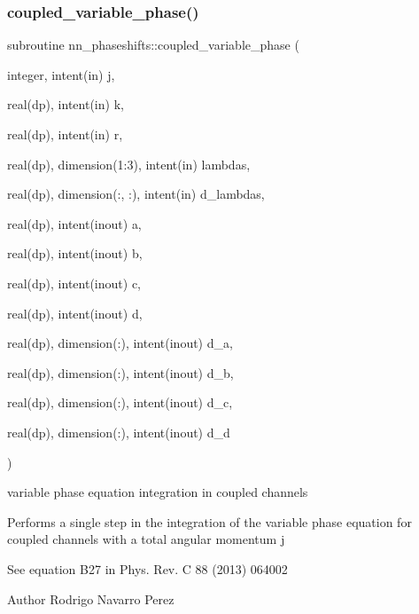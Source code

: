 \subsubsection{\texorpdfstring{coupled\+\_\+variable\+\_\+phase()}{coupled\_variable\_phase()}}
{\footnotesize\ttfamily subroutine nn\+\_\+phaseshifts\+::coupled\+\_\+variable\+\_\+phase (\begin{DoxyParamCaption}\item[{integer, intent(in)}]{j,  }\item[{real(dp), intent(in)}]{k,  }\item[{real(dp), intent(in)}]{r,  }\item[{real(dp), dimension(1\+:3), intent(in)}]{lambdas,  }\item[{real(dp), dimension(\+:, \+:), intent(in)}]{d\+\_\+lambdas,  }\item[{real(dp), intent(inout)}]{a,  }\item[{real(dp), intent(inout)}]{b,  }\item[{real(dp), intent(inout)}]{c,  }\item[{real(dp), intent(inout)}]{d,  }\item[{real(dp), dimension(\+:), intent(inout)}]{d\+\_\+a,  }\item[{real(dp), dimension(\+:), intent(inout)}]{d\+\_\+b,  }\item[{real(dp), dimension(\+:), intent(inout)}]{d\+\_\+c,  }\item[{real(dp), dimension(\+:), intent(inout)}]{d\+\_\+d }\end{DoxyParamCaption})\hspace{0.3cm}{\ttfamily [private]}}



variable phase equation integration in coupled channels 

Performs a single step in the integration of the variable phase equation for coupled channels with a total angular momentum j

See equation B27 in Phys. Rev. C 88 (2013) 064002

\begin{DoxyAuthor}{Author}
Rodrigo Navarro Perez
\end{DoxyAuthor}

